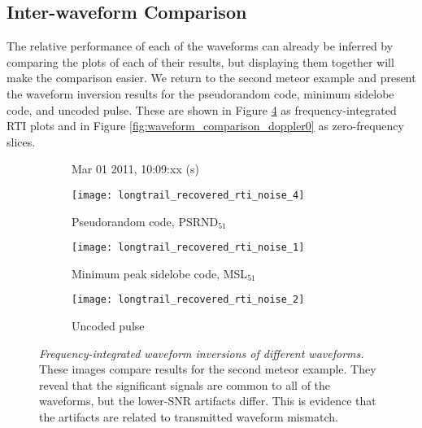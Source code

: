 \subsection{Inter-waveform Comparison}
The relative performance of each of the waveforms can already be inferred by comparing the plots of each of their results, but displaying them together will make the comparison easier. We return to the second meteor example and present the waveform inversion results for the pseudorandom code, minimum sidelobe code, and uncoded pulse. These are shown in Figure \ref{fig:waveform_comparison} as frequency-integrated RTI plots and in Figure \ref{fig:waveform_comparison_doppler0} as zero-frequency slices.
\begin{figure}[tpb]
 \vspace{-1.5\baselineskip}
 \begin{subfigure}{\textwidth}
  \centering
  \textsf{\footnotesize Mar 01 2011, 10:09:xx (s)}
  
  \texttt{[image: longtrail\_recovered\_rti\_noise\_4]}
  \caption{Pseudorandom code, PSRND$_\text{51}$}
  \label{fig:longtrail_psrnd_recovered}
 \end{subfigure}
 
 \vspace{0.5\baselineskip}
 \begin{subfigure}{\textwidth}
  \centering
  \texttt{[image: longtrail\_recovered\_rti\_noise\_1]}
  \caption{Minimum peak sidelobe code, MSL$_\text{51}$}
  \label{fig:longtrail_msl_recovered}
 \end{subfigure}
 
 \vspace{0.5\baselineskip}
 \begin{subfigure}{\textwidth}
  \centering
  \texttt{[image: longtrail\_recovered\_rti\_noise\_2]}
  \caption{Uncoded pulse}
  \label{fig:longtrail_unc_recovered}
 \end{subfigure}
 \caption[Frequency-integrated waveform inversions of different waveforms]{\emph{Frequency-integrated waveform inversions of different waveforms.} These images compare results for the second meteor example. They reveal that the significant signals are common to all of the waveforms, but the lower-SNR artifacts differ. This is evidence that the artifacts are related to transmitted waveform mismatch.}
 \label{fig:waveform_comparison}
\end{figure}%
